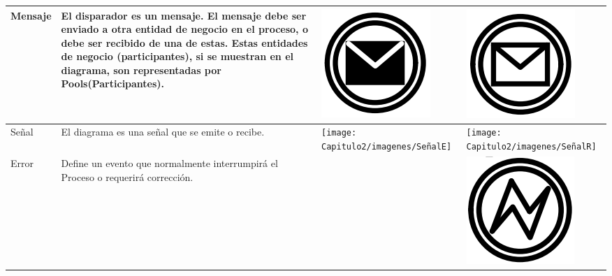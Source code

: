 \begin{table}[H]
\begin{tabular}{ |p{2cm}|p{9.5cm}|p{1.7cm}|p{1.7cm}|  }
		
		\hline
		{\small Mensaje } & {\small El disparador es un mensaje. El mensaje debe ser enviado a otra entidad de negocio en el proceso, o debe ser recibido de una de estas. Estas entidades de negocio (participantes), si se muestran en el diagrama, son representadas por Pools(Participantes). } & \vspace{0.5mm} \hspace{2mm} \includegraphics[scale=0.2]{Capitulo2/imagenes/MensajeE} &\vspace{0.5mm} \hspace{2mm} \includegraphics[scale=0.2]{Capitulo2/imagenes/MensajeR} \\
		\hline
		
		\hline
		{\small Señal } & {\small El diagrama es una señal que se emite o recibe. } & \vspace{0.5mm} \hspace{2mm} \texttt{[image: Capitulo2/imagenes/SeñalE]} &\vspace{0.5mm} \hspace{2mm} \texttt{[image: Capitulo2/imagenes/SeñalR]} \\

		
		\hline
		{\small Error } & {\small Define un evento que normalmente interrumpirá el Proceso o requerirá corrección. } & &\vspace{0.5mm} \hspace{2mm} \includegraphics[scale=0.2]{Capitulo2/imagenes/Error} \\
		\hline
		

\end{tabular}
\end{table}
